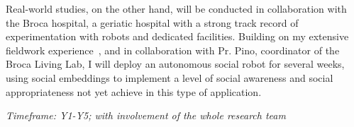 Real-world studies, on the other hand, will be conducted in collaboration with
the Broca hospital, a geriatic hospital with a strong track record of
experimentation with robots and dedicated facilities.  Building on my extensive
fieldwork
experience~\cite{hood2015when,mondada2015ranger,winkle2018social,cooper2023challenges},
and in collaboration with Pr. Pino, coordinator of the Broca Living Lab, I will
deploy an autonomous social robot for several weeks, using social embeddings to
implement a level of social awareness and social appropriateness not yet achieve
in this type of application.

\vspace{1em}
\noindent\emph{Timeframe: Y1-Y5; with involvement of the whole research team}

%
%
%

%
%

%
%
%
%



